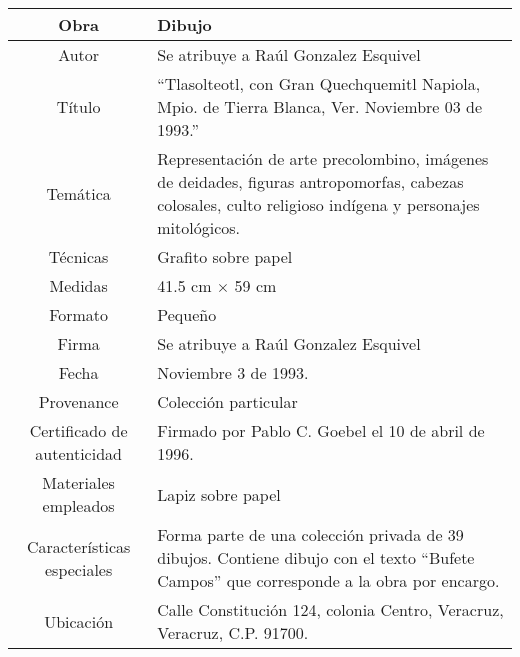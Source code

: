 \documentclass[10pt,letter]{report}
\begin{document}
\begin{table}[H]
\centering
\begin{tabular}{|c|m{}|}
\hline
Obra& Dibujo	\\
\hline
Autor & Se atribuye a Ra\'ul Gonzalez Esquivel\\
\hline
T\'itulo & ``Tlasolteotl, con Gran Quechquemitl  Napiola, Mpio. de Tierra Blanca, Ver. Noviembre 03 de 1993.''\\
\hline
Tem\'atica & Representaci\'on de arte precolombino, im\'agenes de deidades, figuras antropomorfas, cabezas colosales, culto religioso ind\'igena y personajes mitol\'ogicos.\\
\hline
T\'ecnicas &Grafito sobre papel \\
\hline
Medidas & 41.5 cm $\times$ 59 cm \\
\hline
 Formato & Peque\~no \\
 \hline
 Firma & Se atribuye a Ra\'ul Gonzalez Esquivel\\ 
 \hline
  Fecha & Noviembre 3 de 1993.\\
 \hline
 Provenance & Colecci\'on particular\\
 \hline
 Certificado de autenticidad& Firmado por Pablo C. Goebel el 10 de abril de 1996.  \\
 \hline 
  Materiales empleados & Lapiz sobre papel\\
 \hline
 Caracter\'isticas especiales & Forma parte de una colecci\'on privada de 39 dibujos. 
Contiene dibujo con el texto ``Bufete Campos'' que corresponde a la obra por encargo. \\
\hline 
Ubicaci\'on & Calle Constituci\'on 124, colonia Centro, Veracruz, Veracruz, C.P. 91700.\\
\hline

\end{tabular}
\end{table}
\end{document}
